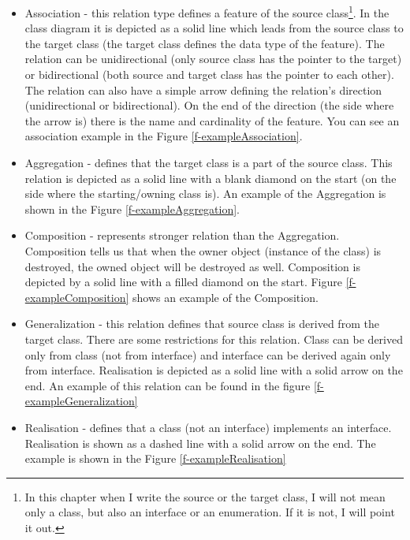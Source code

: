 \begin{itemize}
    \item Association - this relation type defines a feature of the source class\footnote{In this chapter when I write the source or the target class, I will not mean only a class, but also an interface or an enumeration. If it is not, I will point it out.}. In the class diagram it is depicted as a solid line which leads from the source class to the target class (the target class defines the data type of the feature). The relation can be unidirectional (only source class has the pointer to the target) or bidirectional (both source and target class has the pointer to each other). The relation can also have a simple arrow defining the relation's direction (unidirectional or bidirectional). On the end of the direction (the side where the arrow is) there is the name and cardinality of the feature. You can see an association example in the Figure \ref{f-exampleAssociation}.
    \item Aggregation - defines that the target class is a part of the source class. This relation is depicted as a solid line with a blank diamond on the start (on the side where the starting/owning class is). An example of the Aggregation is shown in the Figure \ref{f-exampleAggregation}.
    \item Composition - represents stronger relation than the Aggregation. Composition tells us that when the owner object (instance of the class) is destroyed, the owned object will be destroyed as well. Composition is depicted by a solid line with a filled diamond on the start. Figure \ref{f-exampleComposition} shows an example of the Composition.
    \item Generalization - this relation defines that source class is derived from the target class. There are some restrictions for this relation. Class can be derived only from class (not from interface) and interface can be derived again only from interface. Realisation is depicted as a solid line with a solid arrow on the end. An example of this relation can be found in the figure \ref{f-exampleGeneralization}
    \item Realisation - defines that a class (not an interface) implements an interface. Realisation is shown as a dashed line with a solid arrow on the end. The example is shown in the Figure \ref{f-exampleRealisation}
\end{itemize}

